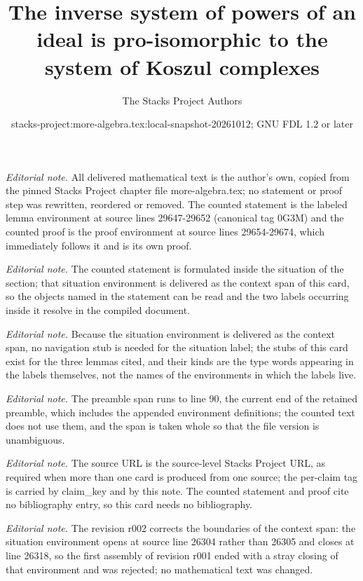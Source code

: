 \documentclass[10pt,a4paper]{amsart}
\title{The inverse system of powers of an ideal is pro-isomorphic to the system of Koszul complexes}
\author{The Stacks Project Authors}
\date{stacks-project:more-algebra.tex:local-snapshot-20261012; GNU FDL 1.2 or later}
\theoremstyle{plain}
\theoremstyle{definition}
\theoremstyle{remark}
\numberwithin{equation}{subsection}
\begin{document}
\maketitle
\setcounter{subsection}{1}
\noindent\textit{Editorial note.} All delivered mathematical text is the author's own, copied from the pinned Stacks Project chapter file more-algebra.tex; no statement or proof step was rewritten, reordered or removed. The counted statement is the labeled lemma environment at source lines 29647-29652 (canonical tag 0G3M) and the counted proof is the proof environment at source lines 29654-29674, which immediately follows it and is its own proof.\par\medskip
\noindent\textit{Editorial note.} The counted statement is formulated inside the situation of the section; that situation environment is delivered as the context span of this card, so the objects named in the statement can be read and the two labels occurring inside it resolve in the compiled document.\par\medskip
\noindent\textit{Editorial note.} Because the situation environment is delivered as the context span, no navigation stub is needed for the situation label; the stubs of this card exist for the three lemmas cited, and their kinds are the type words appearing in the labels themselves, not the names of the environments in which the labels live.\par\medskip
\noindent\textit{Editorial note.} The preamble span runs to line 90, the current end of the retained preamble, which includes the appended environment definitions; the counted text does not use them, and the span is taken whole so that the file version is unambiguous.\par\medskip
\noindent\textit{Editorial note.} The source URL is the source-level Stacks Project URL, as required when more than one card is produced from one source; the per-claim tag is carried by claim\_key and by this note. The counted statement and proof cite no bibliography entry, so this card needs no bibliography.\par\medskip
\noindent\textit{Editorial note.} The revision r002 corrects the boundaries of the context span: the situation environment opens at source line 26304 rather than 26305 and closes at line 26318, so the first assembly of revision r001 ended with a stray closing of that environment and was rejected; no mathematical text was changed.\par\medskip
\end{document}
